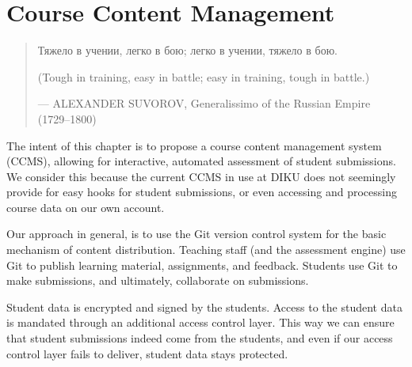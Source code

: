 
\chapter{Course Content Management}

\label{section:infrastructure}

\begin{quotation}

\footnotesize\sffamily\itshape

\begin{flushright}


Тяжело в учении, легко в бою; легко в учении, тяжело в бою.


\smallbreak

(Tough in training, easy in battle; easy in training, tough in battle.)

\smallbreak

\upshape

--- ALEXANDER SUVOROV, Generalissimo of the Russian Empire (1729--1800)

\end{flushright}

\end{quotation}

The intent of this chapter is to propose a course content management system
(CCMS), allowing for interactive, automated assessment of student submissions.
We consider this because the current CCMS in use at DIKU does not seemingly
provide for easy hooks for student submissions, or even accessing and
processing course data on our own account.

Our approach in general, is to use the Git version control system for the basic
mechanism of content distribution. Teaching staff (and the assessment engine)
use Git to publish learning material, assignments, and feedback. Students use
Git to make submissions, and ultimately, collaborate on submissions.

Student data is encrypted and signed by the students. Access to the student
data is mandated through an additional access control layer. This way we can
ensure that student submissions indeed come from the students, and even if our
access control layer fails to deliver, student data stays protected.


